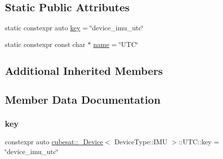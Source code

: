\subsection*{Static Public Attributes}
\begin{DoxyCompactItemize}
\item 
static constexpr auto \hyperlink{structcubesat_1_1__Device_3_01DeviceType_1_1IMU_01_4_1_1UTC_aaa5e58fd399b995fb8ed7bfd69f83220}{key} = \char`\"{}device\+\_\+imu\+\_\+utc\char`\"{}
\item 
static constexpr const char $\ast$ \hyperlink{structcubesat_1_1__Device_3_01DeviceType_1_1IMU_01_4_1_1UTC_ac5b6cbe6bc5ba3913699cfcf2ab37155}{name} = \char`\"{}U\+TC\char`\"{}
\end{DoxyCompactItemize}
\subsection*{Additional Inherited Members}


\subsection{Member Data Documentation}
\mbox{\label{structcubesat_1_1__Device_3_01DeviceType_1_1IMU_01_4_1_1UTC_aaa5e58fd399b995fb8ed7bfd69f83220}} 
\subsubsection{\texorpdfstring{key}{key}}
{\footnotesize\ttfamily constexpr auto \hyperlink{structcubesat_1_1__Device}{cubesat\+::\+\_\+\+Device}$<$ Device\+Type\+::\+I\+MU $>$\+::U\+T\+C\+::key = \char`\"{}device\+\_\+imu\+\_\+utc\char`\"{}\hspace{0.3cm}{\ttfamily [static]}}

\mbox{\label{structcubesat_1_1__Device_3_01DeviceType_1_1IMU_01_4_1_1UTC_ac5b6cbe6bc5ba3913699cfcf2ab37155}} 
